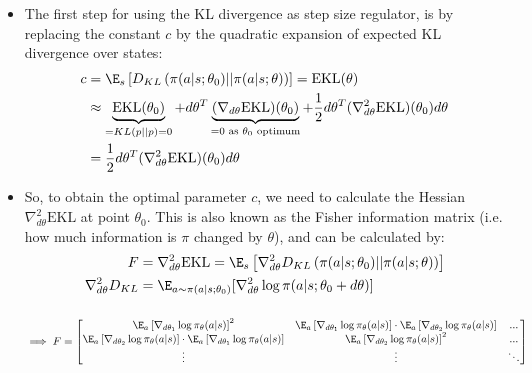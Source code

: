 \begin{itemize}
	\item The first step for using the KL divergence as step size regulator, is by replacing the constant $c$ by the quadratic expansion of expected KL divergence over states:
	\begin{equation*}
		\begin{split}
			c & = \E_{s}\left[D_{KL}\left(\pi(a|s;\theta_0)||\pi(a|s;\theta)\right)\right] = \text{EKL}(\theta)\\
			& \approx \underbrace{\text{EKL}(\theta_0)}_{=KL(p||p)=0} + d\theta^T \underbrace{(\nabla_{d\theta}\text{EKL})(\theta_0)}_{=0 \text{ as }\theta_0\text{ optimum}} + \frac{1}{2}d\theta^T (\nabla_{d\theta}^2\text{EKL})(\theta_0)d\theta\\
			& = \frac{1}{2}d\theta^T (\nabla_{d\theta}^2\text{EKL})(\theta_0)d\theta\\
		\end{split}
	\end{equation*}
	\item So, to obtain the optimal parameter $c$, we need to calculate the Hessian $\nabla_{d\theta}^2\text{EKL}$ at point $\theta_0$. This is also known as the Fisher information matrix (i.e. how much information is $\pi$ changed by $\theta$), and can be calculated by:
	\begin{equation*}
		\begin{split}
			F & = \nabla_{d\theta}^2\text{EKL} = \E_{s}\left[\nabla_{d\theta}^2 D_{KL}\left(\pi(a|s;\theta_0)||\pi(a|s;\theta)\right)\right]\\
			\nabla_{d\theta}^2 D_{KL} & = \E_{a\sim\pi(a|s;\theta_0)}[\nabla_{d\theta}^2 \log \pi(a|s;\theta_0+d\theta)]\\[10pt]
		\end{split}
	\end{equation*}
	$$\implies F = \begin{bmatrix}
	\E_a\left[\nabla_{d\theta_1} \log \pi_{\theta}(a|s)\right]^2 & \E_a\left[\nabla_{d\theta_1} \log \pi_{\theta}(a|s)\right]\cdot \E_a\left[\nabla_{d\theta_2} \log \pi_{\theta}(a|s)\right] & ...\\
	\E_a\left[\nabla_{d\theta_2} \log \pi_{\theta}(a|s)\right]\cdot \E_a\left[\nabla_{d\theta_1} \log \pi_{\theta}(a|s)\right] & \E_a\left[\nabla_{d\theta_2} \log \pi_{\theta}(a|s)\right]^2 & ...\\
	\vdots & \vdots & \ddots
	\end{bmatrix}$$
	

\end{itemize}

